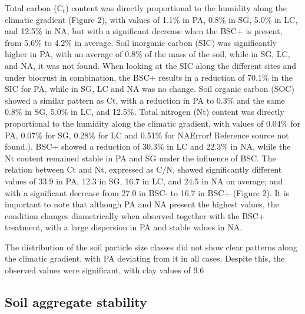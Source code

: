 Total carbon (C$_t$) content was directly proportional to the humidity along the climatic gradient (Figure 2), with values of 1.1\% in PA, 0.8\% in SG, 5.0\% in LC, and 12.5\% in NA, but with a significant decrease when the BSC+ is present, from 5.6\% to 4.2\% in average. Soil inorganic carbon (SIC) was significantly higher in PA, with an average of 0.8\% of the mass of the soil, while in SG, LC, and NA, it was not found. When looking at the SIC along the different sites and under biocrust in combination, the BSC+ results in a reduction of 70.1\% in the SIC for PA, while in SG, LC and NA was no change. Soil organic carbon (SOC) showed a similar pattern as Ct, with a reduction in PA to 0.3\% and the same 0.8\% in SG, 5.0\% in LC, and 12.5\%. Total nitrogen (Nt) content was directly proportional to the humidity along the climatic gradient, with values of 0.04\% for PA, 0.07\% for SG, 0.28\% for LC and 0.51\% for NAError! Reference source not found.). BSC+ showed a reduction of 30.3\% in LC and 22.3\% in NA, while the Nt content remained stable in PA and SG under the influence of BSC. The relation between Ct and Nt, expressed as C/N, showed significantly different values of 33.9 in PA, 12.3 in SG, 16.7 in LC, and 24.5 in NA on average; and with a significant decrease from 27.0 in BSC- to 16.7 in BSC+ (Figure 2). It is important to note that although PA and NA present the highest values, the condition changes diametrically when observed together with the BSC+ treatment, with a large dispersion in PA and stable values in NA.

The distribution of the soil particle size classes did not show clear patterns along the climatic gradient, with PA deviating from it in all cases. Despite this, the observed values were significant, with clay values of 9.6%

\subsection{Soil aggregate stability}

